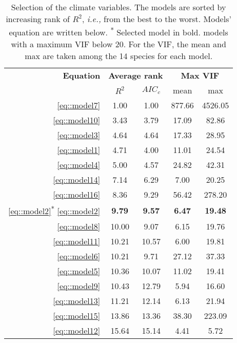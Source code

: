 \documentclass[letterpaper, 12pt]{article}
\newcommand {\ie}{\textit{i.e., }}
\theoremstyle{theo}
\begin{document}
\begin{refsection}
\begin{onehalfspace}
\begin{table}[h!]
\centering
\caption{Selection of the climate variables. The models are sorted by increasing rank of $ R^2 $, \ie from the best to the worst. Models' equation are written below. \textsuperscript{*} Selected model in bold. \dag models with a maximum VIF below 20. For the VIF, the mean and max are taken among the 14 species for each model.}
\label{tab::climSelection}
\begin{tabular}{@{}rcccc@{}}
	\toprule
	\textbf{Equation} & \multicolumn{2}{c}{\textbf{Average rank}} & \multicolumn{2}{c}{\textbf{Max VIF}} \\
		\cmidrule(lr){2-3} \cmidrule(lr){4-5}
		& $ R^2 $ & $ AIC_c $ & mean & max \\
	\midrule
	\ref{eq::model7} & 1.00 & 1.00 & 877.66 & 4526.05 \\
	\ref{eq::model10} & 3.43 & 3.79 & 17.09 & 82.86 \\
	\ref{eq::model3} & 4.64 & 4.64 & 17.33 & 28.95 \\
	\ref{eq::model1} & 4.71 & 4.00 & 11.01 & 24.54 \\
	\ref{eq::model4} & 5.00 & 4.57 & 24.82 & 42.31 \\
	\ref{eq::model14} & 7.14 & 6.29 & 7.00 & 20.25 \\
	\ref{eq::model16} & 8.36 & 9.29 & 56.42 & 278.20 \\
	\ref{eq::model2}\textsuperscript{*} \dag \ref{eq::model2} & \textbf{9.79} & \textbf{9.57} & \textbf{6.47} & \textbf{19.48} \\
	\ref{eq::model8} \dag & 10.00 & 9.07 & 6.15 & 19.76 \\
	\ref{eq::model11} \dag & 10.21 & 10.57 & 6.00 & 19.81 \\
	\ref{eq::model6} & 10.21 & 9.71 & 27.12 & 37.33 \\
	\ref{eq::model5} \dag & 10.36 & 10.07 & 11.02 & 19.41 \\
	\ref{eq::model9} \dag & 10.43 & 12.79 & 5.94 & 16.60 \\
	\ref{eq::model13} & 11.21 & 12.14 & 6.13 & 21.94 \\
	\ref{eq::model15} & 13.86 & 13.36 & 38.30 & 223.09 \\
	\ref{eq::model12} \dag & 15.64 & 15.14 & 4.41 & 5.72 \\
	\bottomrule
\end{tabular}
\end{table}


\end{onehalfspace}
\end{refsection}
\end{document}
